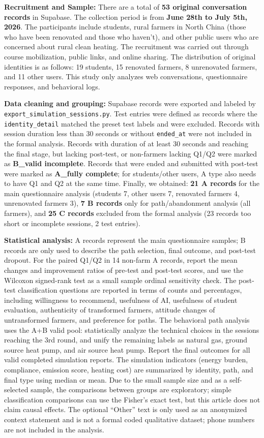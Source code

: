 \documentclass[stu,12pt,floatsintext,donotrepeattitle]{apa7}
\begin{document}
\textbf{Recruitment and Sample:} There are a total of \textbf{53 original conversation records} in Supabase. The collection period is from \textbf{June 28th to July 5th, 2026}. The participants include students, rural farmers in North China (those who have been renovated and those who haven't), and other public users who are concerned about rural clean heating. The recruitment was carried out through course mobilization, public links, and online sharing. The distribution of original identities is as follows: 19 students, 15 renovated farmers, 8 unrenovated farmers, and 11 other users. This study only analyzes web conversations, questionnaire responses, and behavioral logs.

\textbf{Data cleaning and grouping:} Supabase records were exported and labeled by \texttt{export\_simulation\_sessions.py}. Test entries were defined as records where the \texttt{identity\_detail} matched the preset test labels and were excluded. Records with session duration less than 30 seconds or without \texttt{ended\_at} were not included in the formal analysis. Records with duration of at least 30 seconds and reaching the final stage, but lacking post-test, or non-farmers lacking Q1/Q2 were marked as \textbf{B\_valid incomplete}. Records that were ended and submitted with post-test were marked as \textbf{A\_fully complete}; for students/other users, A type also needs to have Q1 and Q2 at the same time. Finally, we obtained: \textbf{21 A records} for the main questionnaire analysis (students 7, other users 7, renovated farmers 4, unrenovated farmers 3), \textbf{7 B records} only for path/abandonment analysis (all farmers), and \textbf{25 C records} excluded from the formal analysis (23 records too short or incomplete sessions, 2 test entries).

\textbf{Statistical analysis:} A records represent the main questionnaire samples; B records are only used to describe the path selection, final outcome, and post-test dropout. For the paired Q1/Q2 in 14 non-farm A records, report the mean changes and improvement ratios of pre-test and post-test scores, and use the Wilcoxon signed-rank test as a small sample ordinal sensitivity check. The post-test classification questions are reported in terms of counts and percentages, including willingness to recommend, usefulness of AI, usefulness of student evaluation, authenticity of transformed farmers, attitude changes of untransformed farmers, and preference for paths. The behavioral path analysis uses the A+B valid pool: statistically analyze the technical choices in the sessions reaching the 3rd round, and unify the remaining labels as natural gas, ground source heat pump, and air source heat pump. Report the final outcomes for all valid completed simulation reports. The simulation indicators (energy burden, compliance, emission score, heating cost) are summarized by identity, path, and final type using median or mean. Due to the small sample size and as a self-selected sample, the comparisons between groups are exploratory; simple classification comparisons can use the Fisher's exact test, but this article does not claim causal effects. The optional ``Other'' text is only used as an anonymized context statement and is not a formal coded qualitative dataset; phone numbers are not included in the analysis.
\end{document}
